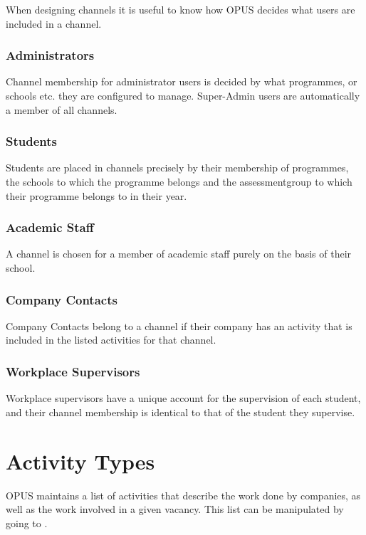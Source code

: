 \documentclass[12 pt]{book}
\begin{document}
When designing channels it is useful to know how OPUS decides what users are
included in a channel.

\subsubsection{Administrators}

Channel membership for administrator users is decided by what programmes, or
schools etc. they are configured to manage. Super-Admin users are automatically
a member of all channels.

\subsubsection{Students}

Students are placed in channels precisely by their membership of programmes,
the schools to which the programme belongs and the assessmentgroup to which
their programme belongs to in their year.

\subsubsection{Academic Staff}

A channel is chosen for a member of academic staff purely on the basis of their
school.

\subsubsection{Company Contacts}

Company Contacts belong to a channel if their company has an activity that is
included in the listed activities for that channel.

\subsubsection{Workplace Supervisors}

Workplace supervisors have a unique account for the supervision of each student,
and their channel membership is identical to that of the student they
supervise.

\section{Activity Types}
\label{ActivityTypes}

OPUS maintains a list of activities that describe the work done by companies,
as well as the work involved in a given vacancy. This list can be manipulated
by going to .
\end{document}
